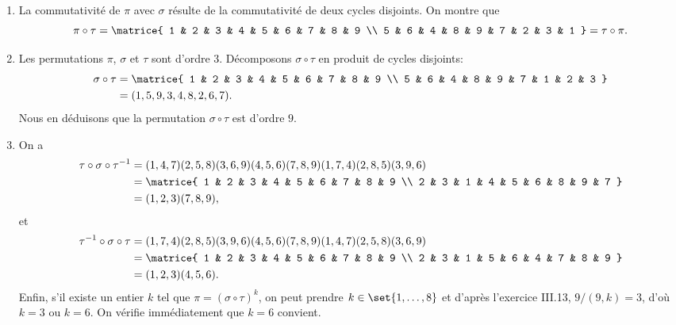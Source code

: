 \begin{enumerate}
  \item  %
    La commutativité de $\pi$ avec $\sigma$ résulte de la commutativité de deux cycles disjoints.
    On montre que
    \[
      \pi\circ\tau = \matrice{
        1 & 2 & 3 & 4 & 5 & 6 & 7 & 8 & 9 \\
        5 & 6 & 4 & 8 & 9 & 7 & 2 & 3 & 1
      } = \tau\circ\pi.
    \]

  \item %
    Les permutations $\pi$, $\sigma$ et $\tau$ sont d'ordre $3$.
    Décomposons $\sigma\circ\tau$ en produit de cycles disjoints:
    \begin{align*}
      \sigma\circ\tau
        &= \matrice{
            1 & 2 & 3 & 4 & 5 & 6 & 7 & 8 & 9 \\
            5 & 6 & 4 & 8 & 9 & 7 & 1 & 2 & 3
        } \\
        &= (1,5,9,3,4,8,2,6,7).
    \end{align*}
    Nous en déduisons que la permutation $\sigma\circ\tau$ est d'ordre $9$.

  \item %
    On a
    \begin{align*}
      \tau\circ\sigma\circ\tau^{-1}
        &= (1,4,7)(2,5,8)(3,6,9)(4,5,6)(7,8,9)(1,7,4)(2,8,5)(3,9,6) \\
        &= \matrice{
            1 & 2 & 3 & 4 & 5 & 6 & 7 & 8 & 9 \\
            2 & 3 & 1 & 4 & 5 & 6 & 8 & 9 & 7
        } \\
        &= (1,2,3)(7,8,9),
    \end{align*}
    et
    \begin{align*}
      \tau^{-1}\circ\sigma\circ\tau
        &= (1,7,4)(2,8,5)(3,9,6)(4,5,6)(7,8,9)(1,4,7)(2,5,8)(3,6,9) \\
        &= \matrice{
            1 & 2 & 3 & 4 & 5 & 6 & 7 & 8 & 9 \\
            2 & 3 & 1 & 5 & 6 & 4 & 7 & 8 & 9
        } \\
        &= (1,2,3)(4,5,6).
    \end{align*}
    Enfin, s'il existe un entier $k$ tel que $\pi = (\sigma\circ \tau)^k$, on peut prendre $k\in\set{1,\dots,8}$ et
    d'après l'exercice III.13, $9/(9,k) = 3$, d'où $k = 3$ ou $k = 6$.
    On vérifie immédiatement que $k = 6$ convient.
\end{enumerate}
